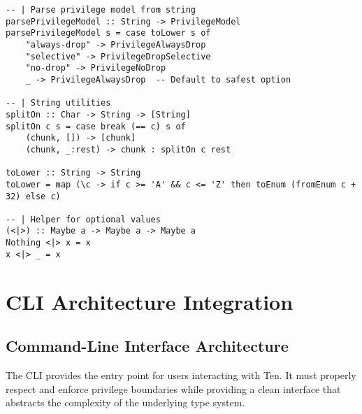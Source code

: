 \documentclass{article}
\begin{document}
\begin{tcolorbox}[title=Ten/Daemon/Config.hs Changes]
\begin{verbatim}
-- | Parse privilege model from string
parsePrivilegeModel :: String -> PrivilegeModel
parsePrivilegeModel s = case toLower s of
    "always-drop" -> PrivilegeAlwaysDrop
    "selective" -> PrivilegeDropSelective
    "no-drop" -> PrivilegeNoDrop
    _ -> PrivilegeAlwaysDrop  -- Default to safest option

-- | String utilities
splitOn :: Char -> String -> [String]
splitOn c s = case break (== c) s of
    (chunk, []) -> [chunk]
    (chunk, _:rest) -> chunk : splitOn c rest

toLower :: String -> String
toLower = map (\c -> if c >= 'A' && c <= 'Z' then toEnum (fromEnum c + 32) else c)

-- | Helper for optional values
(<|>) :: Maybe a -> Maybe a -> Maybe a
Nothing <|> x = x
x <|> _ = x
\end{verbatim}
\end{tcolorbox}

\section{CLI Architecture Integration}

\subsection{Command-Line Interface Architecture}

The CLI provides the entry point for users interacting with Ten. It must properly respect and enforce privilege boundaries while providing a clean interface that abstracts the complexity of the underlying type system.
\end{document}
